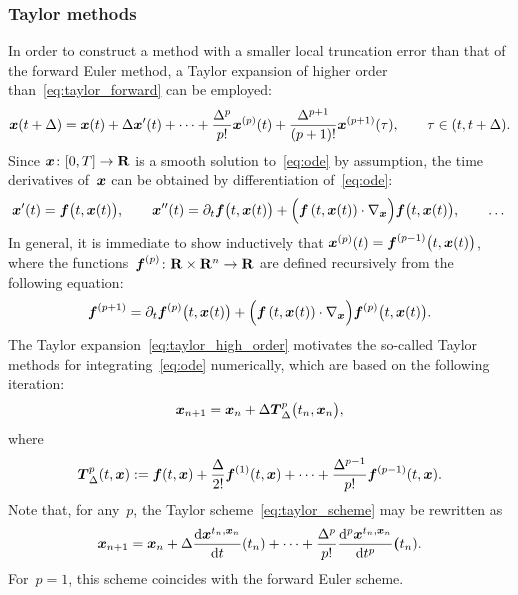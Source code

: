 \subsubsection*{Taylor methods}%
In order to construct a method with a smaller local truncation error than that of the forward Euler method,
a Taylor expansion of higher order than~\eqref{eq:taylor_forward} can be employed:
\begin{equation}
    \label{eq:taylor_high_order}
    \mathbf{\boldsymbol{x}}(t + \Delta) = \mathbf{\boldsymbol{x}}(t)
    + \Delta \mathbf{\boldsymbol{x}}'(t)
    + \dotsb
    + \frac{\Delta^p}{p!} \mathbf{\boldsymbol{x}}^{(p)}(t)
    + \frac{\Delta^{p+1}}{(p+1)!} \mathbf{\boldsymbol{x}}^{(p+1)}(\tau),
    \qquad \tau \in (t, t + \Delta).
\end{equation}
Since $\mathbf{\boldsymbol{x}}\colon [0, T] \to \mathbf R$ is a smooth solution to~\eqref{eq:ode} by assumption,
the time derivatives of~$\mathbf{\boldsymbol{x}}$ can be obtained by differentiation of~\eqref{eq:ode}:
\[
    \mathbf{\boldsymbol{x}}'(t) = \mathbf{\boldsymbol{f}}\bigl(t, \mathbf{\boldsymbol{x}}(t)\bigr),
    \qquad
    \mathbf{\boldsymbol{x}}''(t) = \partial_t \mathbf{\boldsymbol{f}}\bigl(t, \mathbf{\boldsymbol{x}}(t)\bigr)
    + \Bigl( \mathbf{\boldsymbol{f}}\left(t, \mathbf{\boldsymbol{x}}(t)\right) \cdot \nabla_{\mathbf{\boldsymbol{x}}} \Bigr) \mathbf{\boldsymbol{f}}\bigl( t, \mathbf{\boldsymbol{x}}(t) \bigr),
    \qquad
    \dotsc
\]
In general, it is immediate to show inductively that $\mathbf{\boldsymbol{x}}^{(p)}(t) = \mathbf{\boldsymbol{f}}^{(p-1)}\bigl(t, \mathbf{\boldsymbol{x}}(t)\bigr)$,
where the functions~$\mathbf{\boldsymbol{f}}^{(p)}\colon \mathbf R \times \mathbf R^n \to \mathbf R$ are defined recursively from the following equation:
\[
    \mathbf{\boldsymbol{f}}^{(p+1)} = \partial_t \mathbf{\boldsymbol{f}}^{(p)}\bigl(t, \mathbf{\boldsymbol{x}}(t)\bigr) + \Bigl( \mathbf{\boldsymbol{f}}\left(t, \mathbf{\boldsymbol{x}}(t)\right) \cdot \nabla_{\mathbf{\boldsymbol{x}}} \Bigr) \mathbf{\boldsymbol{f}}^{(p)}\bigl( t, \mathbf{\boldsymbol{x}}(t) \bigr).
\]
The Taylor expansion~\eqref{eq:taylor_high_order} motivates the so-called Taylor methods for integrating~\eqref{eq:ode} numerically,
which are based on the following iteration:
\begin{equation}
    \label{eq:taylor_scheme}
    \mathbf{\boldsymbol{x}}_{n+1} = \mathbf{\boldsymbol{x}}_n + \Delta \mathbf{\boldsymbol{T}}^{p}_{\Delta}\bigl(t_n, \mathbf{\boldsymbol{x}}_n\bigr),
\end{equation}
where
\[
    \mathbf{\boldsymbol{T}}^p_{\Delta}(t, \mathbf{\boldsymbol{x}})
    := \mathbf{\boldsymbol{f}}(t, \mathbf{\boldsymbol{x}}) + \frac{\Delta}{2!} \mathbf{\boldsymbol{f}}^{(1)}(t, \mathbf{\boldsymbol{x}})
    + \dotsb + \frac{\Delta^{p-1}}{p!} \mathbf{\boldsymbol{f}}^{(p-1)}(t, \mathbf{\boldsymbol{x}}).
\]
Note that, for any~$p$,
the Taylor scheme~\eqref{eq:taylor_scheme} may be rewritten as
\[
    \mathbf{\boldsymbol{x}}_{n+1} = \mathbf{\boldsymbol{x}}_n
    + \Delta \frac{\mathrm d \mathbf{\boldsymbol{x}}^{t_n, \mathbf{\boldsymbol{x}}_n}}{\mathrm d t} (t_n)
    + \dotsb
    + \frac{\Delta^p}{p!} \frac{\mathrm d^p \mathbf{\boldsymbol{x}}^{t_n, \mathbf{\boldsymbol{x}}_n}}{\mathrm d t^{p}} \mathbf{\boldsymbol{(}}t_n).
\]
For~$p=1$, this scheme coincides with the forward Euler scheme.


